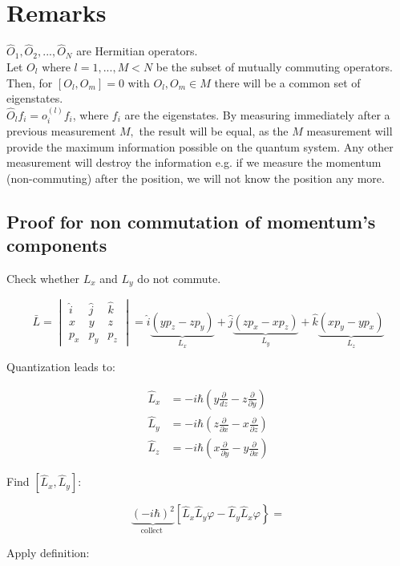 \section{Remarks}
$\hat{O}_1,\hat{O}_2,...,\hat{O}_N$ are Hermitian operators.\\
Let ${O_l}$ where ${l=1,...,M<N}$ be the subset of mutually commuting operators. Then, for $[O_l,O_m]=0$ with $O_l,O_m \in M$ there will be a common set of eigenstates.\\
\noindent
$\hat{O}_lf_i=o_i^{(l)}f_i$, where $f_i$ are the eigenstates.
By measuring immediately after a previous measurement $M,$ the result will be equal, as the $M$ measurement will provide the maximum information possible on the quantum system.
Any other measurement will destroy the information e.g. if we measure the momentum (non-commuting) after the position, we will not know the position any more.

	\subsection{Proof for non commutation of momentum's components}
	Check whether $L_x$ and $L_y$ do not commute.

	$$\bar{L}=\begin{vmatrix}\hat{i}& \hat{j}& \hat{k} \\ x& y& z \\ p_{x}& p_{y}& p_{z}\end{vmatrix}=\hat{i} \underbrace{\left(y p_{z}-z p_{y}\right)}_{L_{x}}+\hat{j}\underbrace{(z p_{x}-x p_{z})}_{L_{y}}+\hat{k} \underbrace{\left(x p_{y}-y p_{x}\right)}_{L_{z}}$$

	Quantization leads to:

	\begin{align*}
		\hat{L}_{x}&=-i \hbar\left(y \frac{\partial}{d z}-z \frac{\partial}{\partial y}\right) \\
		\hat{L}_{y}&=-i \hbar\left(z \frac{\partial}{\partial x}-x \frac{\partial}{\partial z}\right)\\
		\hat{L}_{z}&=-i \hbar\left(x \frac{\partial}{\partial y}-y \frac{\partial}{\partial x}\right)
	\end{align*}

	Find $\left[\hat{L}_{x}, \hat{L}_{y}\right]$:

	$$\underbrace{(-i \hbar)^{2}}_{\text {collect }}\left[\hat{L}_{x} \hat{L}_{y} \varphi-\hat{L}_{y} \hat{L}_{x}\varphi\right\}=$$

	Apply definition:

